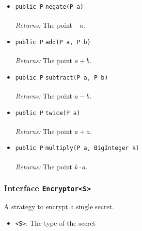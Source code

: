 \begin{itemize}
\item \lstinline|public P| \lstinline|negate|\lstinline|(P a)|\\ \\[-0.6em]
\emph{Returns:} The point $-a$.



\item \lstinline|public P| \lstinline|add|\lstinline|(P a, P b)|\\ \\[-0.6em]
\emph{Returns:} The point $a + b$.



\item \lstinline|public P| \lstinline|subtract|\lstinline|(P a, P b)|\\ \\[-0.6em]
\emph{Returns:} The point $a - b$.



\item \lstinline|public P| \lstinline|twice|\lstinline|(P a)|\\ \\[-0.6em]
\emph{Returns:} The point $a + a$.



\item \lstinline|public P| \lstinline|multiply|\lstinline|(P a, BigInteger k)|\\ \\[-0.6em]
\emph{Returns:} The point $k \cdot a$.



\end{itemize}

\subsubsection{Interface \lstinline|Encryptor<S>|}
A strategy to encrypt a single secret. \\
\noindent\begin{minipage}[t]{5cm}
\vspace{0.3em}
\hspace*{2em}
\vspace{0.3em}
\end{minipage}

\begin{itemize}
\item \lstinline|<S>|: The type of the secret
\end{itemize}




